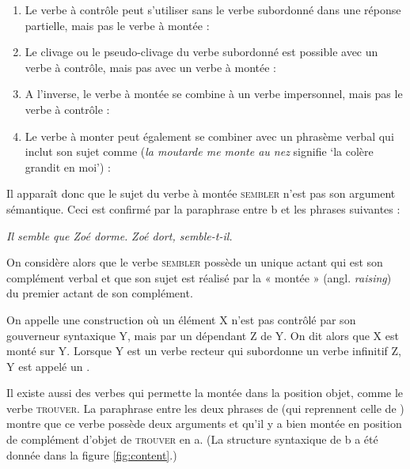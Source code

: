 \begin{enumerate}[label=(\arabic*)]
\item	Le verbe à contrôle peut s’utiliser sans le verbe subordonné dans une réponse partielle, mais pas le verbe à montée :
\ea{}
\z\z

\item	Le clivage ou le pseudo-clivage du verbe subordonné est possible avec un verbe à contrôle, mais pas avec un verbe à montée :
\ea{}
\z\z

\item	A l’inverse, le verbe à montée se combine à un verbe impersonnel, mais pas le verbe à contrôle :
\ea{}
\z\z

\item	Le verbe à monter peut également se combiner avec un phrasème verbal qui inclut son sujet comme  (\textit{la moutarde me monte au nez} signifie ‘la colère grandit en moi’) :
\ea{}
\z\z

\end{enumerate}

Il apparaît donc que le sujet du verbe à montée \textsc{sembler} n’est pas son argument sémantique. Ceci est confirmé par la paraphrase entre b et les phrases suivantes :

\ea\ea \textit{Il semble que Zoé dorme.}
\ex \textit{Zoé dort, semble-t-il.}\z\z

On considère alors que le verbe \textsc{sembler} possède un unique actant qui est son complément verbal et que son sujet est réalisé par la « montée » (angl. \textit{raising}) du premier actant de son complément. 

{On appelle  une construction où un élément X n’est pas contrôlé par son gouverneur syntaxique Y, mais par un dépendant Z de Y. On dit alors que X est monté sur Y. Lorsque Y est un verbe recteur qui subordonne un verbe infinitif Z, Y est appelé un .}

Il existe aussi des verbes qui permette la montée dans la position objet, comme le verbe \textsc{trouver}. La paraphrase entre les deux phrases de  (qui reprennent celle de ) montre que ce verbe possède deux arguments et qu’il y a bien montée en position de complément d’objet de \textsc{trouver} en a. (La structure syntaxique de b a été donnée dans la figure \ref{fig:content}.)

